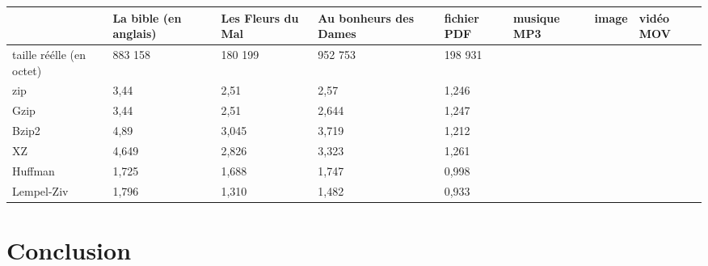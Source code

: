 \documentclass{report}
\begin{document}
\begin{flushleft}
{\renewcommand{\arraystretch}{2}
\begin{tabular}{|p{1.5cm}|p{1.5cm}|p{1.5cm}|p{1.5cm}|p{1.5cm}|p{1.5cm}|p{1.5cm}|p{1.5cm}|}
\hline
 & La bible (en anglais)  & Les Fleurs du Mal  & Au bonheurs des Dames & fichier PDF & musique  MP3 & image & vidéo MOV\\
\hline
taille réélle (en octet)  & 883 158 & 180 199 & 952 753 & 198 931 & & & \\\hline
zip & 3,44 & 2,51 & 2,57 & 1,246 & & & \\
\hline
Gzip & 3,44 & 2,51 & 2,644 & 1,247 & & & \\
\hline
Bzip2 & 4,89 & 3,045 & 3,719 & 1,212 & & & \\
\hline
XZ & 4,649 & 2,826 & 3,323 & 1,261 & & & \\
\hline
Huffman & 1,725 & 1,688 & 1,747 & 0,998 & & & \\
\hline
Lempel-Ziv & 1,796 & 1,310 & 1,482 & 0,933 & & & \\
\hline

\end{tabular}
}
\end{flushleft}

\section*{Conclusion}
\end{document}
